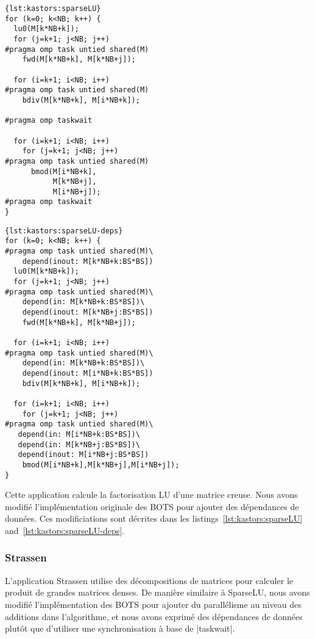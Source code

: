 \begin{lstlisting}[caption=LU utilisant des tâches indépendantes,frame=tlrb,label=lst:kastors:sparseLU]{lst:kastors:sparseLU}
for (k=0; k<NB; k++) {
  lu0(M[k*NB+k]);
  for (j=k+1; j<NB; j++)
#pragma omp task untied shared(M)
    fwd(M[k*NB+k], M[k*NB+j]);

  for (i=k+1; i<NB; i++)
#pragma omp task untied shared(M)
    bdiv(M[k*NB+k], M[i*NB+k]);

#pragma omp taskwait

  for (i=k+1; i<NB; i++)
    for (j=k+1; j<NB; j++)
#pragma omp task untied shared(M)
      bmod(M[i*NB+k],
           M[k*NB+j],
           M[i*NB+j]);
#pragma omp taskwait
}
\end{lstlisting}

\begin{lstlisting}[caption=LU utilisant des tâches avec dépendances,frame=tlrb,label=lst:kastors:sparseLU-deps]{lst:kastors:sparseLU-deps}
for (k=0; k<NB; k++) {
#pragma omp task untied shared(M)\
    depend(inout: M[k*NB+k:BS*BS])
  lu0(M[k*NB+k]);
  for (j=k+1; j<NB; j++)
#pragma omp task untied shared(M)\
    depend(in: M[k*NB+k:BS*BS])\
    depend(inout: M[k*NB+j:BS*BS])
    fwd(M[k*NB+k], M[k*NB+j]);

  for (i=k+1; i<NB; i++)
#pragma omp task untied shared(M)\
    depend(in: M[k*NB+k:BS*BS])\
    depend(inout: M[i*NB+k:BS*BS])
    bdiv(M[k*NB+k], M[i*NB+k]);

  for (i=k+1; i<NB; i++)
    for (j=k+1; j<NB; j++)
#pragma omp task untied shared(M)\
   depend(in: M[i*NB+k:BS*BS])\
   depend(in: M[k*NB+j:BS*BS])\
   depend(inout: M[i*NB+j:BS*BS])
    bmod(M[i*NB+k],M[k*NB+j],M[i*NB+j]);
}
\end{lstlisting}

Cette application calcule la factorisation LU d'une matrice creuse.
Nous avons modifié l'implémentation originale des BOTS pour ajouter des dépendances de données.
Ces modificiations sont décrites dans les listings~\ref{lst:kastors:sparseLU} and~\ref{lst:kastors:sparseLU-deps}.

\subsubsection{Strassen}

L'application Strassen utilise des décompositions de matrices pour calculer le produit de grandes matrices denses.
De manière similaire à SparseLU, nous avons modifié l'implémentation des BOTS pour ajouter du parallélisme au niveau des additions dans l'algorithme, et nous avons exprimé des dépendances de données plutôt que d'utiliser une synchronisation à base de |taskwait|.


